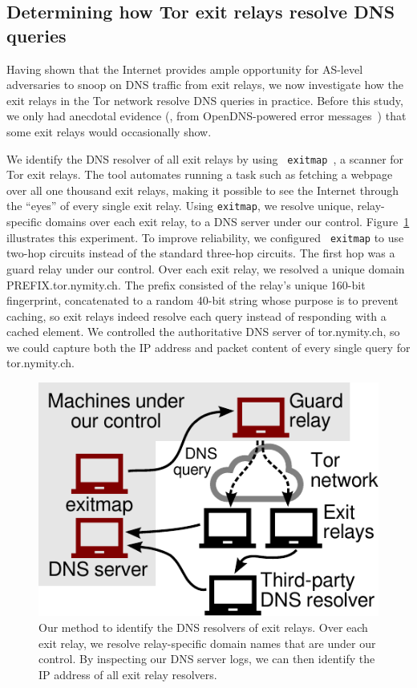 \subsection{Determining how Tor exit relays resolve DNS queries}
\label{sec:mapping-resolvers}

Having shown that the Internet provides ample opportunity for
AS-level adversaries to snoop on DNS traffic from exit relays, we
now investigate how the exit relays in the Tor network resolve DNS
queries in practice. Before this study,
we only had anecdotal evidence (\eg, from OpenDNS-powered error
messages~\cite[\S~4.1]{Winter2014b}) that some exit relays would occasionally
show.

We identify the DNS resolver of all exit relays by using {\tt
exitmap}~\cite{exitmap}, a scanner for Tor exit relays.  The tool automates
running a task such as fetching a webpage over all one thousand exit relays,
making it possible to see the Internet through the ``eyes'' of every single exit
relay.  Using {\tt exitmap}, we resolve unique, relay-specific domains over each
exit relay, to a DNS server under our control.  Figure~\ref{fig:dnsenum}
illustrates this experiment.  To improve reliability, we configured {\tt
exitmap} to use two-hop circuits instead of the standard three-hop circuits.
The first hop was a guard relay under our control.  Over each exit relay, we
resolved a unique domain PREFIX.tor.nymity.ch.  The prefix consisted of
the relay's unique 160-bit fingerprint, concatenated to a random 40-bit string
whose purpose is to prevent caching, so exit relays indeed resolve each query
instead of responding with a cached element.  We controlled the authoritative
DNS server of tor.nymity.ch, so we could capture both the IP address and
packet content of every single query for tor.nymity.ch.

\begin{figure}[t]
	\centering
	\includegraphics[width=0.6\linewidth]{figures/resolver-identification.pdf}
	\caption{Our method to identify the DNS resolvers of exit relays.  Over
	each exit relay, we resolve relay-specific domain names that are under our
	control.  By inspecting our DNS server logs, we can then identify the IP
	address of all exit relay resolvers.}
	\label{fig:dnsenum}
\end{figure}

